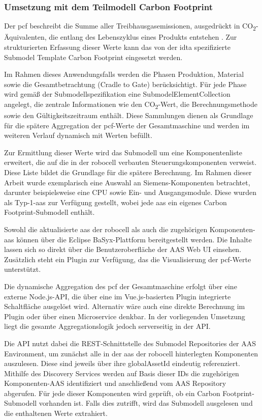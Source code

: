 \subsubsection{Umsetzung mit dem Teilmodell Carbon Footprint}
Der \acs{pcf} beschreibt die Summe aller Treibhausgasemissionen, ausgedrückt in CO\textsubscript{2}-Äquivalenten, die entlang des Lebenszyklus eines Produkts entstehen \cite{PCF}. 
Zur strukturierten Erfassung dieser Werte kann das von der \acs{idta} spezifizierte Submodel Template Carbon Footprint \cite{SpezifikaitonPCF} eingesetzt werden.

Im Rahmen dieses Anwendungsfalls werden die Phasen Produktion, Material sowie die Gesamtbetrachtung (Cradle to Gate) berücksichtigt. 
Für jede Phase wird gemäß der Submodellspezifikation eine SubmodelElementCollection angelegt, die zentrale Informationen wie den CO\textsubscript{2}-Wert, die Berechnungsmethode sowie den Gültigkeitszeitraum enthält. 
Diese Sammlungen dienen als Grundlage für die spätere Aggregation der \acs{pcf}-Werte der Gesamtmaschine und werden im weiteren Verlauf dynamisch mit Werten befüllt.

Zur Ermittlung dieser Werte wird das Submodell um eine Komponentenliste erweitert, die auf die in der robocell verbauten Steuerungskomponenten verweist. 
Diese Liste bildet die Grundlage für die spätere Berechnung. 
Im Rahmen dieser Arbeit wurde exemplarisch eine Auswahl an Siemens-Komponenten betrachtet, darunter beispielsweise eine CPU sowie Ein- und Ausgangsmodule. 
Diese wurden als Typ-1-\acs{aas} zur Verfügung gestellt, wobei jede \acs{aas} ein eigenes Carbon Footprint-Submodell enthält.

Sowohl die aktualisierte \acs{aas} der robocell als auch die zugehörigen Komponenten-\acs{aas} können über die Eclipse BaSyx-Plattform bereitgestellt werden. 
Die Inhalte lassen sich so direkt über die Benutzeroberfläche der AAS Web UI einsehen. 
Zusätzlich steht ein Plugin zur Verfügung, das die Visualisierung der \acs{pcf}-Werte unterstützt.

Die dynamische Aggregation des \acs{pcf} der Gesamtmaschine erfolgt über eine externe Node.js-API, die über eine im Vue.js-basierten Plugin integrierte Schaltfläche ausgelöst wird. 
Alternativ wäre auch eine direkte Berechnung im Plugin oder über einen Microservice denkbar. 
In der vorliegenden Umsetzung liegt die gesamte Aggregationslogik jedoch serverseitig in der API.

Die API nutzt dabei die REST-Schnittstelle des Submodel Repositories der AAS Environment, um zunächst alle in der \acs{aas} der robocell hinterlegten Komponenten auszulesen. 
Diese sind jeweils über ihre globalAssetId eindeutig referenziert. 
Mithilfe des Discovery Services werden auf Basis dieser IDs die zugehörigen Komponenten-AAS identifiziert und anschließend vom AAS Repository abgerufen. 
Für jede dieser Komponenten wird geprüft, ob ein Carbon Footprint-Submodell vorhanden ist. 
Falls dies zutrifft, wird das Submodell ausgelesen und die enthaltenen Werte extrahiert.

